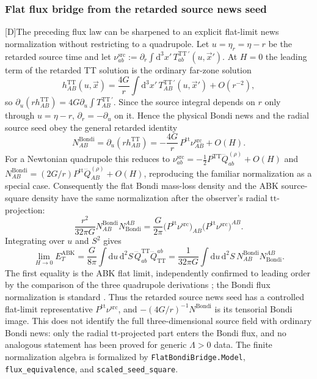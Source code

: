 \documentclass[11pt,a4paper]{article}
\newcommand{\diff}{\mathrm{d}}
\newcommand{\statusD}{\textsf{[D]}}
\begin{document}
\subsubsection{Flat flux bridge from the retarded source news seed}
\statusD The preceding flux law can be sharpened to an explicit flat-limit news normalization without restricting to a quadrupole.  Let \(u=\eta_r=\eta-r\) be the retarded source time and let
\(\nu^{\mathrm{src}}_{ab}:=\partial_r\int \diff^3x'\,T^{\mathrm{TT}\, '}_{ab}(u,\vec x')\).  At \(H=0\) the leading term of the retarded TT solution is the ordinary far-zone solution
\[
  h^{\mathrm{TT}}_{AB}(u,\vec x)
  =
  \frac{4G}{r}
  \int \diff^3x'\,T^{\mathrm{TT}\, '}_{AB}(u,\vec x')
  +O(r^{-2}),
\]
so \(\partial_u(rh^{\mathrm{TT}}_{AB})=4G\partial_u\int T^{\mathrm{TT}\, '}_{AB}\).  Since the source integral depends on \(r\) only through \(u=\eta-r\), \(\partial_r=-\partial_u\) on it.  Hence the physical Bondi news and the radial source seed obey the general retarded identity
\begin{equation}\label{eq:flat-bondi-news-from-seed}
  N^{\mathrm{Bondi}}_{AB}
  =
  \partial_u\!\left(rh^{\mathrm{TT}}_{AB}\right)
  =
  -\frac{4G}{r}\,
  P^{\mathrm{tt}}\nu^{\mathrm{src}}_{AB}
  +O(H) .
\end{equation}
For a Newtonian quadrupole this reduces to \(\nu^{\mathrm{src}}_{ab}=-\tfrac12P^{\mathrm{TT}}\dddot Q^{(\rho)}_{ab}+O(H)\) and \(N^{\mathrm{Bondi}}_{AB}=(2G/r)P^{\mathrm{tt}}\dddot Q^{(\rho)}_{AB}+O(H)\), reproducing the familiar normalization as a special case.
Consequently the flat Bondi mass-loss density and the ABK source-square density have the same normalization after the observer's radial \(\mathrm{tt}\)-projection:
\begin{equation}\label{eq:flat-flux-bridge}
  \frac{r^2}{32\pi G}
  N^{\mathrm{Bondi}}_{AB}N_{\mathrm{Bondi}}^{AB}
  =
  \frac{G}{2\pi}
  \big(P^{\mathrm{tt}}\nu^{\mathrm{src}}\big)_{AB}
  \big(P^{\mathrm{tt}}\nu^{\mathrm{src}}\big)^{AB}.
\end{equation}
Integrating over \(u\) and \(S^2\) gives
\[
  \lim_{H\to0}E_T^{\mathrm{ABK}}
  =
  \frac{G}{8\pi}
  \int \diff u\,\diff^2S\,
  \dddot Q^{\mathrm{TT}}_{ab}\dddot Q_{\mathrm{TT}}^{ab}
  =
  \frac{1}{32\pi G}
  \int \diff u\,\diff^2S\,
  N^{\mathrm{Bondi}}_{AB}N_{\mathrm{Bondi}}^{AB}.
\]
The first equality is the ABK flat limit, independently confirmed to leading order by the comparison of the three quadrupole derivations \cite{ashtekar2015quadrupole,dobkowski2025comparison}; the Bondi flux normalization is standard \cite{wald1984general}.  Thus the retarded source news seed has a controlled flat-limit representative \(P^{\mathrm{tt}}\nu^{\mathrm{src}}\), and \(-(4G/r)^{-1}N^{\mathrm{Bondi}}\) is its tensorial Bondi image.  This does not identify the full three-dimensional source field with ordinary Bondi news: only the radial \(\mathrm{tt}\)-projected part enters the Bondi flux, and no analogous statement has been proved for generic \(\Lambda>0\) data.  The finite normalization algebra is formalized by \texttt{FlatBondiBridge.Model}, \texttt{flux\_equivalence}, and \texttt{scaled\_seed\_square}.
\end{document}
